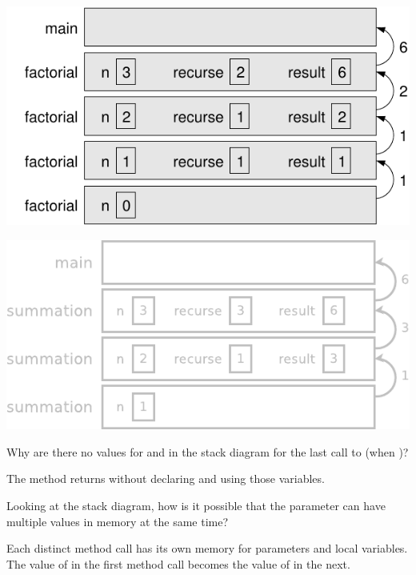 \vspace{1em}
\begin{minipage}{0.48\linewidth}

\includegraphics[width=\linewidth]{stack3.pdf}

\end{minipage}
\hfill
\begin{minipage}{0.48\linewidth}

\begin{answer}[115pt]
\includegraphics[width=\linewidth]{stack3-ans.pdf}
\end{answer}

\end{minipage}
\vspace{1em}


\Q Why are there no values for  and  in the stack diagram for the last call to  (when )?

\begin{answer}
The method returns without declaring and using those variables.
\end{answer}


\Q Looking at the stack diagram, how is it possible that the parameter  can have multiple values in memory at the same time?

\begin{answer}
Each distinct method call has its own memory for parameters and local variables.
The value of  in the first method call becomes the value of  in the next.
\end{answer}
